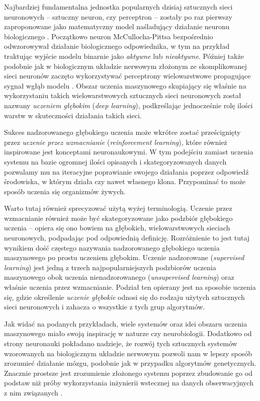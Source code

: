 Najbardziej fundamentalna jednostka popularnych dzisiaj sztucznych sieci neuronowych -- sztuczny neuron, czy perceptron -- zostały po raz pierwszy zaproponowane jako matematyczny model naśladujący działanie neuronu biologicznego \cite{mcculloch1943logical}.
Początkowo neuron McCullocha-Pittsa bezpośrednio odwzorowywał działanie biologicznego odpowiednika, w tym na przykład traktując wyjście modelu binarnie jako \emph{aktywne} lub \emph{nieaktywne}.
Później także podobnie jak w biologicznym układzie nerwowym złożonym ze skomplikowanej sieci neuronów zaczęto wykorzystywać perceptrony wielowarstwowe propagujące sygnał wgłąb modelu \cite{rosenblatt1961principles}.
Obszar uczenia maszynowego skupiający się właśnie na wykorzystaniu takich wielowarstwowych sztucznych sieci neuronowych został nazwany \emph{uczeniem głębokim} (\emph{deep learning}), podkreślając jednocześnie rolę ilości warstw w skuteczności działania takich sieci.

Sukces nadzorowanego głębokiego uczenia może wkrótce zostać prześcignięty przez \emph{uczenie przez wzmacnianie} (\emph{reinforcement learning}), które również inspirowane jest konceptami neuronaukowymi.
W tym podejściu zamiast uczenia systemu na bazie ogromnej ilości opisanych i skategoryzowanych danych pozwalamy mu na iteracyjne poprawianie swojego działania poprzez odpowiedź środowiska, w którym działa czy nawet własnego klona.
Przypominać to może sposób uczenia się organizmów żywych.

Warto tutaj również sprecyzować użytą wyżej terminologią.
Uczenie przez wzmacnianie również może być skategoryzowane jako podzbiór głębokiego uczenia -- opiera się ono bowiem na głębokich, wielowarstwowych sieciach neuronowych, podpadając pod odpowiednią definicję.
Rozróżnienie to jest tutaj wynikiem dość częstego nazywania nadzorowanego głębokiego uczenia maszynowego po prostu uczeniem głębokim.
Uczenie nadzorowane (\emph{supervised learning}) jest jedną z trzech najpopularniejszych podzbiorów uczenia maszynowego obok uczenia nienadzorowanego (\emph{unsupervised learning}) oraz właśnie uczenia przez wzmacnianie.
Podział ten opierany jest na sposobie uczenia się, gdzie określenie \emph{uczenie głębokie} odnosi się do rodzaju użytych sztucznych sieci neuronowych i zahacza o wszystkie z tych grup algorytmów.

Jak widać na podanych przykładach, wiele systemów oraz idei obszaru uczenia maszynowego miało swoją inspirację w naturze czy neurobiologii.
Dodatkowo od strony neuronauki pokładano nadzieje, że rozwój tych sztucznych systemów wzorowanych na biologicznym układzie nerwowym pozwoli nam w lepszy sposób zrozumieć działanie mózgu, podobnie jak w przypadku algorytmów genetycznych.
Znacznie prostsze jest zrozumienie złożonego systemu poprzez zbudowanie go od podstaw niż próby wykorzystania inżynierii wstecznej na danych obserwacyjnych z nim związanych \cite{braitenberg1986vehicles}.

